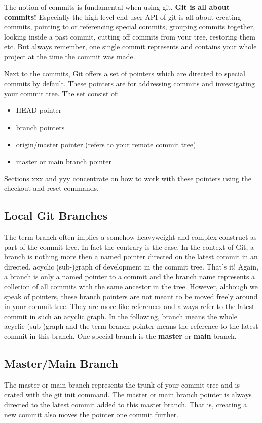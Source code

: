 The notion of commits is fundamental when using git. \textbf{Git is all about commits!} Especially the high level end user API of 
git is all about creating commits, pointing to or referencing special commits, grouping commits together,
looking inside a past commit, cutting off commits from your tree, restoring them etc.
But always remember, one single commit represents and contains your whole project at the time the commit 
was made.
   
Next to the commits, Git offers a set of pointers which are directed to special commits by default. These 
pointers are for addressing commits and investigating your commit tree. The set consist of:
\begin{itemize}
	\item HEAD pointer
	\item branch pointers
	\item origin/master pointer (refers to your remote commit tree)
	\item master or main branch pointer
\end{itemize}

Sections xxx and yyy concentrate on how to work with these pointers using the checkout and reset 
commands.


\subsection*{Local Git Branches}

The term branch often implies a somehow heavyweight and complex construct as part of the commit 
tree. In fact the contrary is the case. In the context of Git, a branch is nothing more then 
a named pointer directed on the latest commit in an directed, acyclic (sub-)graph of development
in the commit tree. That's it! Again, a branch is only a named pointer to a commit and the 
branch name represents a colletion of all commits with the same ancestor in the tree. However, although
we speak of pointers, these branch pointers are not meant to be moved freely around in your commit tree.
They are more like references and always refer to the latest commit in such an acyclic graph.
In the following, branch means the whole acyclic (sub-)graph and the term branch pointer 
means the reference to the latest commit in this branch.
One special branch is the \textbf{master} or \textbf{main} branch.

\subsection*{Master/Main Branch}
The master or main branch represents the trunk of your commit tree and is crated 
with the git init command. The master or main branch pointer is always directed to the latest commit added to 
this master branch. That is, creating a new commit also moves the pointer one commit further.

